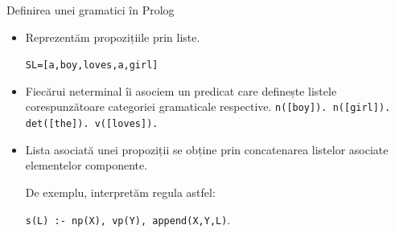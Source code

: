 \documentclass[xcolor=x11names,compress,10pt]{beamer}
\begin{document}
\begin{frame}{Definirea unei gramatici în Prolog}
\begin{itemize}
\item  Reprezentăm propozițiile prin  liste.
\begin{alltt}
SL = [a, boy, loves, a, girl]
\end{alltt}
\medskip\pause

\item Fiecărui neterminal îi asociem un predicat care definește listele corespunzătoare categoriei gramaticale respective. 
\medskip
\texttt{n([boy]). n([girl]). det([the]). v([loves]).}
\medskip\pause

\item Lista asociată unei  propoziții se obține prin concatenarea listelor asociate elementelor componente.
\medskip\pause

De exemplu, interpretăm regula  astfel:
\medskip

\medskip

\texttt{s(L) :- np(X), vp(Y), append(X,Y,L)}.

\end{itemize}

\end{frame}
\end{document}
